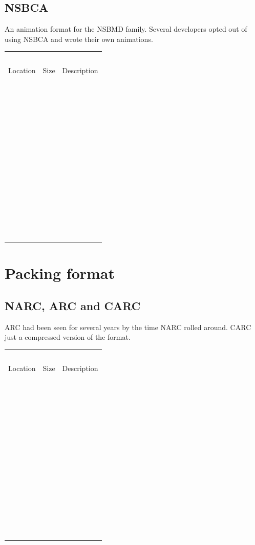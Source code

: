 \documentclass[
]{book}
\begin{document}
\hypertarget{nsbca}{%
\section{NSBCA}\label{nsbca}}

An animation format for the NSBMD family. Several developers opted out of using NSBCA and wrote their own animations.

\begin{longtable}[]{@{}lll@{}}
\toprule()
\endhead
  &   &   \\
Location & Size & Description \\
  &   &   \\
  &   &   \\
  &   &   \\
  &   &   \\
  &   &   \\
  &   &   \\
  &   &   \\
  &   &   \\
  &   &   \\
  &   &   \\
  &   &   \\
  &   &   \\
  &   &   \\
\bottomrule()
\end{longtable}

\hypertarget{packing-format}{%
\chapter{Packing format}\label{packing-format}}

\hypertarget{narc-arc-and-carc}{%
\section{NARC, ARC and CARC}\label{narc-arc-and-carc}}

ARC had been seen for several years by the time NARC rolled around. CARC just a compressed version of the format.

\begin{longtable}[]{@{}lll@{}}
\toprule()
\endhead
  &   &   \\
Location & Size & Description \\
  &   &   \\
  &   &   \\
  &   &   \\
  &   &   \\
  &   &   \\
  &   &   \\
  &   &   \\
  &   &   \\
  &   &   \\
  &   &   \\
  &   &   \\
  &   &   \\
  &   &   \\
\bottomrule()
\end{longtable}
\end{document}

